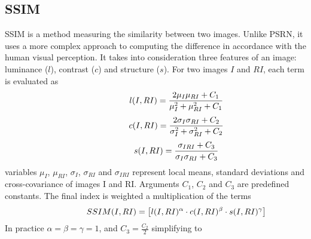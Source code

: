 \subsection{SSIM}
SSIM is a method measuring the similarity between two images. Unlike PSRN, it uses a more complex approach to computing the difference in accordance with the human visual perception. It takes into consideration three features of an image: luminance ($l$), contrast ($c$) and structure ($s$). For two images $I$ and $RI$, each term is evaluated as
\begin{equation} \label{eq:Lumi}
\centering
\hspace{3em} \hspace{3em} \hspace{3em} l(I,RI)= \frac{2\mu_{I} \mu_{RI} + C_1}{\mu_{I}^2 + \mu_{RI}^2 + C_1} \enspace \enspace \hspace{3em}
\end{equation}
\begin{equation} \label{eq:contra}
\centering
\hspace{3em} \hspace{3em} \hspace{3em} c(I,RI)= \frac{2\sigma_{I} \sigma_{RI} + C_2}{\sigma_{I}^2 + \sigma_{RI}^2 + C_2} \enspace \enspace \hspace{3em}
\end{equation}
\begin{equation} \label{eq:Struct}
\centering
\hspace{3em} \hspace{3em} \hspace{3em} s(I,RI)= \frac{\sigma_{IRI} + C_3}{\sigma_{I} \sigma_{RI} + C_3} \enspace \enspace \hspace{3em}
\end{equation}
variables $\mu_{I}$, $\mu_{RI}$, $\sigma_{I}$, $\sigma_{RI}$ and $\sigma_{IRI}$ represent local means, standard deviations and cross-covariance of images I and RI. Arguments $C_1$, $C_2$ and $C_3$ are predefined constants. The final index is weighted a multiplication of the terms
\begin{equation} \label{eq:ssim1}
\centering
\hspace{3em} \hspace{3em} \hspace{3em} SSIM(I,RI)= \big[ l(I,RI)^{\alpha} \cdot c(I,RI)^{\beta} \cdot s(I,RI)^{\gamma} \big]   \enspace \enspace \hspace{3em}
\end{equation}
In practice $\alpha = \beta = \gamma = 1$, and $C_3 = \frac{C_2}{2}$ simplifying to
